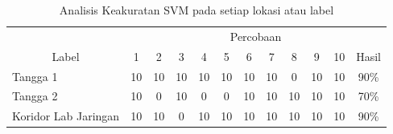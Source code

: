 \begin{enumerate}
	      \begin{table}[H]
		      \center
		      \caption{Analisis Keakuratan SVM pada setiap lokasi atau label}
		      \label{tabelpercobaansvm}
		      \begin{tabular}{|lccccccccccc|}
			      \hline
			      \multicolumn{1}{|c|}{\cellcolor[HTML]{EFEFEF}}                        & \multicolumn{11}{c|}{\cellcolor[HTML]{EFEFEF}Percobaan}                                                                                                                                                                                                                                                   \\ \cline{2-12}
			      \multicolumn{1}{|c|}{\multirow{-2}{*}{\cellcolor[HTML]{EFEFEF}Label}} & \multicolumn{1}{c|}{1}                                  & \multicolumn{1}{c|}{2}  & \multicolumn{1}{c|}{3}  & \multicolumn{1}{c|}{4}  & \multicolumn{1}{c|}{5}  & \multicolumn{1}{c|}{6}  & \multicolumn{1}{c|}{7}  & \multicolumn{1}{c|}{8}  & \multicolumn{1}{c|}{9}  & \multicolumn{1}{c|}{10} & Hasil \\ \hline
			      \multicolumn{1}{|l|}{Tangga 1}                                        & \multicolumn{1}{c|}{10}                                 & \multicolumn{1}{c|}{10} & \multicolumn{1}{c|}{10} & \multicolumn{1}{c|}{10} & \multicolumn{1}{c|}{10} & \multicolumn{1}{c|}{10} & \multicolumn{1}{c|}{10} & \multicolumn{1}{c|}{0}  & \multicolumn{1}{c|}{10} & \multicolumn{1}{c|}{10} & 90\%  \\ \hline
			      \multicolumn{1}{|l|}{Tangga 2}                                        & \multicolumn{1}{c|}{10}                                 & \multicolumn{1}{c|}{0}  & \multicolumn{1}{c|}{10} & \multicolumn{1}{c|}{0}  & \multicolumn{1}{c|}{0}  & \multicolumn{1}{c|}{10} & \multicolumn{1}{c|}{10} & \multicolumn{1}{c|}{10} & \multicolumn{1}{c|}{10} & \multicolumn{1}{c|}{10} & 70\%  \\ \hline
			      \multicolumn{1}{|l|}{Koridor Lab Jaringan}                            & \multicolumn{1}{c|}{10}                                 & \multicolumn{1}{c|}{10} & \multicolumn{1}{c|}{0}  & \multicolumn{1}{c|}{10} & \multicolumn{1}{c|}{10} & \multicolumn{1}{c|}{10} & \multicolumn{1}{c|}{10} & \multicolumn{1}{c|}{10} & \multicolumn{1}{c|}{10} & \multicolumn{1}{c|}{10} & 90\%  \\ \hline

\end{tabular}
\end{table}
\end{enumerate}
